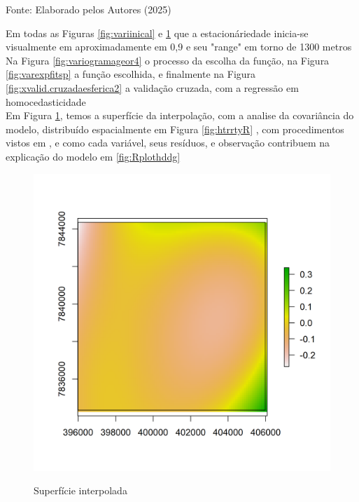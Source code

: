 			\begin{center}
				Fonte:   Elaborado pelos Autores (2025)
			\end{center}
 \hspace*{1.25 cm} 	Em todas as Figuras \ref{fig:variinical} e \ref{fig:superfdicie} que a estacionáriedade  inicia-se visualmente em aproximadamente em 0,9 e seu "range" em torno de 1300 metros\\
 \hspace*{1.25 cm} Na Figura \ref{fig:variogramageor4} o processo da escolha da função, na Figura \ref{fig:varexpfitsp} a função escolhida, e finalmente na Figura \ref{fig:xvalid.cruzadaesferica2} a validação cruzada, com a regressão em homocedasticidade\\
 \hspace*{1.25 cm} Em Figura \ref{fig:superfdicie}, temos a superfície da interpolação, com a analise da covariância do modelo, distribuído espacialmente em Figura \ref{fig:htrrtyR} , com procedimentos vistos em   \cite[p.47]{delgado}, e como cada variável, seus resíduos, e observação contribuem na explicação do modelo em \ref{fig:Rplothddg} \\
 			\begin{minipage}[t!]{0.31\textwidth}
 				\begin{figure}[H]
 					\centering \small \caption{Superfície interpolada}
 					\includegraphics[width=0.97\linewidth]{FIGURAS/superficie}
 					\label{fig:superfdicie}
 				\end{figure}			
 				
 			\end{minipage}\hfill
